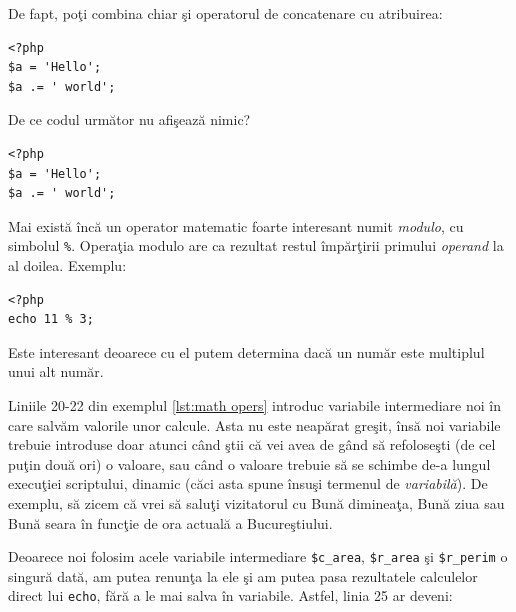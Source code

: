 De fapt, poţi combina chiar şi operatorul de concatenare
cu atribuirea:
\begin{lstlisting}
<?php
$a = 'Hello';
$a .= ' world';
\end{lstlisting}

\begin{Exercise}[title={Lipsă output}]
De ce codul următor nu afişează nimic?
\begin{lstlisting}
<?php
$a = 'Hello';
$a .= ' world';
\end{lstlisting}
\end{Exercise}

\label{term:modulo}
Mai există încă un operator matematic foarte interesant numit \textsl{modulo},
cu simbolul \texttt{\%}. Operaţia modulo are ca rezultat restul
împărţirii primului \textsl{operand} la al doilea. Exemplu:
\begin{lstlisting}
<?php
echo 11 % 3;
\end{lstlisting}
Este interesant deoarece cu el putem determina dacă un număr este multiplul
unui alt număr.


Liniile 20-22 din exemplul \ref{lst:math opers}
introduc variabile intermediare noi în care
salvăm valorile unor calcule. Asta nu este neapărat greşit,
însă noi variabile trebuie introduse doar atunci când
ştii că vei avea de gând să refoloseşti (de cel puţin
două ori) o valoare, sau când o valoare trebuie să
se schimbe de-a lungul execuţiei scriptului, dinamic
(căci asta spune însuşi termenul de \textit{variabilă}).
De exemplu, să zicem că vrei să saluţi vizitatorul
cu {\glqq}Bună dimineaţa{\grqq}, {\glqq}Bună ziua{\grqq} sau {\glqq}Bună seara{\grqq}
în funcţie de ora actuală a Bucureştiului.

Deoarece noi folosim acele variabile intermediare
\texttt{\$c\_area}, \texttt{\$r\_area} şi \texttt{\$r\_perim} o singură dată, am
putea renunţa la ele şi am putea pasa rezultatele
calculelor direct lui \texttt{echo},
fără a le mai salva în variabile. Astfel, linia 25
ar deveni:




